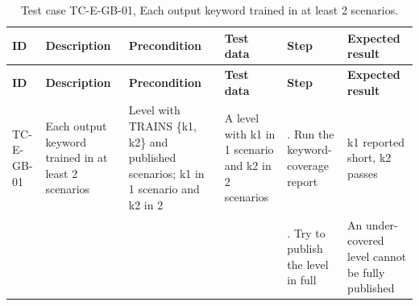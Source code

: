 {\footnotesize{}\renewcommand{\arraystretch}{1.1}
\begin{longtable}{|>{\raggedright\arraybackslash}p{}|>{\raggedright\arraybackslash}p{}|>{\raggedright\arraybackslash}p{}|>{\raggedright\arraybackslash}p{}|>{\raggedright\arraybackslash}p{}|>{\raggedright\arraybackslash}p{}|}
\caption{Test case TC-E-GB-01, Each output keyword trained in at least 2 scenarios.} \\
\hline
\textbf{ID} & \textbf{Description} & \textbf{Precondition} & \textbf{Test data} & \textbf{Step} & \textbf{Expected result} \\ \hline
\endfirsthead
\hline
\textbf{ID} & \textbf{Description} & \textbf{Precondition} & \textbf{Test data} & \textbf{Step} & \textbf{Expected result} \\ \hline
\endhead
TC-E-GB-01 & Each output keyword trained in at least 2 scenarios & Level with TRAINS \{k1, k2\} and published scenarios; k1 in 1 scenario and k2 in 2 & A level with k1 in 1 scenario and k2 in 2 scenarios & 1. Run the keyword-\allowbreak{}coverage report & k1 reported short, k2 passes \\ \cline{5-6}
 &  &  &  & 2. Try to publish the level in full & An under-\allowbreak{}covered level cannot be fully published \\ \hline
\end{longtable}
}

